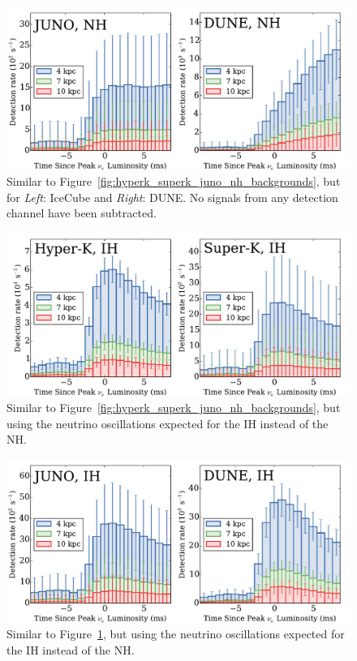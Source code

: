 
\begin{figure}[h]
\centerline{\includegraphics[width=\linewidth]{backgrounds_histogram_groupingnumber_1_NH.pdf}}
\caption{\label{fig:icecube_dune_nh_backgrounds} Similar to
  Figure~\ref{fig:hyperk_superk_juno_nh_backgrounds}, but for {\it Left}:
  IceCube and {\it Right}: DUNE. No signals from any detection channel
  have been subtracted.
}
\end{figure}


\begin{figure}[h]
\centerline{\includegraphics[width=\linewidth]{backgrounds_histogram_groupingnumber_0_IH.pdf}}
\caption{\label{fig:hyperk_superk_juno_ih_backgrounds} Similar to 
  Figure~\ref{fig:hyperk_superk_juno_nh_backgrounds}, but using the neutrino
  oscillations expected for the IH instead of the NH.
}
\end{figure}


\begin{figure}[h]
\centerline{\includegraphics[width=\linewidth]{backgrounds_histogram_groupingnumber_1_IH.pdf}}
\caption{\label{fig:icecube_dune_ih_backgrounds} Similar to
  Figure~\ref{fig:icecube_dune_nh_backgrounds}, but using the neutrino
  oscillations expected for the IH instead of the NH.
}
\end{figure}


